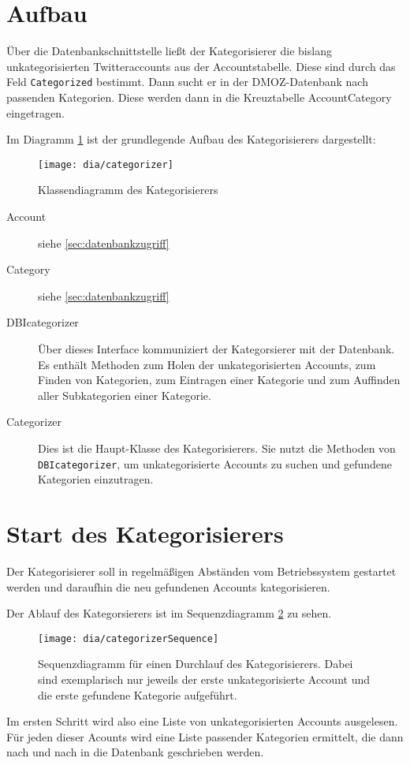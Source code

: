 \section{Aufbau}
Über die Datenbankschnittstelle ließt der Kategorisierer die bislang unkategorisierten Twitteraccounts aus der Accountstabelle. Diese sind durch das Feld \lstinline{Categorized} bestimmt. Dann sucht er in der DMOZ-Datenbank nach passenden Kategorien. Diese werden dann in die Kreuztabelle AccountCategory eingetragen.

Im Diagramm \ref{fig:categorizer} ist der grundlegende Aufbau des Kategorisierers dargestellt:
\begin{figure}[h!]
	\centering
	\texttt{[image: dia/categorizer]}
	\caption{Klassendiagramm des Kategorisierers}
	\label{fig:categorizer}
\end{figure}
\begin{description}
	\item[Account] siehe \cref{sec:datenbankzugriff}
	\item[Category] siehe \cref{sec:datenbankzugriff}
	\item[DBIcategorizer] Über dieses Interface kommuniziert der Kategorsierer mit der Datenbank. Es enthält Methoden zum Holen der unkategorisierten Accounts, zum Finden von Kategorien, zum Eintragen einer Kategorie und zum Auffinden aller Subkategorien einer Kategorie.
	\item[Categorizer] Dies ist die Haupt-Klasse des Kategorisierers. Sie nutzt die Methoden von \lstinline{DBIcategorizer}, um unkategorisierte Accounts zu suchen und gefundene Kategorien einzutragen.
\end{description}

\section{Start des Kategorisierers}
Der Kategorisierer soll in regelmäßigen Abständen vom Betriebssystem gestartet werden und daraufhin die neu gefundenen Accounts kategorisieren.

Der Ablauf des Kategorsierers ist im Sequenzdiagramm \ref{fig:categorizerSeq} zu sehen.
\begin{figure}[h!]
	\centering
	\texttt{[image: dia/categorizerSequence]}
	\caption{Sequenzdiagramm für einen Durchlauf des Kategorisierers. Dabei sind exemplarisch nur jeweils der erste unkategorisierte Account und die erste gefundene Kategorie aufgeführt.}
	\label{fig:categorizerSeq}
\end{figure}

Im ersten Schritt wird also eine Liste von unkategorisierten Accounts ausgelesen. Für jeden dieser Acounts wird eine Liste passender Kategorien ermittelt, die dann nach und nach in die Datenbank geschrieben werden.
